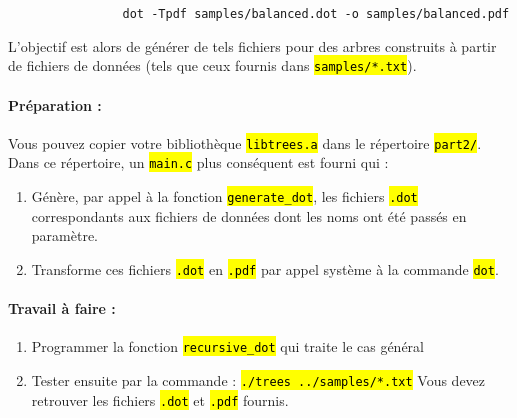 \documentclass[final, pdftex, a4paper, openbib, ]{article}
\let\OldTexttt\texttt
\renewcommand{\texttt}[1]{\OldTexttt{\hl{#1}}}
\begin{document}
\begin{verbatim}
				dot -Tpdf samples/balanced.dot -o samples/balanced.pdf
\end{verbatim}

L'objectif est alors de générer de tels fichiers pour des arbres construits à partir de fichiers de données (tels que ceux fournis dans \texttt{samples/*.txt}).
					
\paragraph{Préparation :} Vous pouvez copier votre bibliothèque \texttt{libtrees.a} dans le répertoire \texttt{part2/}. Dans ce répertoire, un \texttt{main.c} plus conséquent est fourni qui :
\begin{enumerate}
	\item Génère, par appel à la fonction \texttt{generate\_dot}, les fichiers \texttt{.dot} correspondants aux fichiers de données dont les noms ont été passés en paramètre.
	\item Transforme ces fichiers \texttt{.dot} en \texttt{.pdf} par appel système à la commande \texttt{dot}.
\end{enumerate}

\paragraph{Travail à faire :}
\begin{enumerate}
	\item Programmer la fonction \texttt{recursive\_dot} qui traite le cas général
	\item Tester ensuite par la commande : \texttt{./trees ../samples/*.txt}
Vous devez retrouver les fichiers \texttt{.dot} et \texttt{.pdf} fournis.
\end{enumerate}

\end{document}
